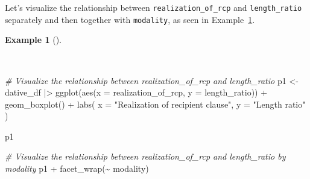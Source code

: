 \documentclass[
  letterpaper,
  DIV=11,
  numbers=noendperiod]{scrreprt}
\newenvironment{Shaded}{\begin{snugshade}}{\end{snugshade}}
\newcommand{\AttributeTok}[1]{\textcolor[rgb]{0.00,0.00,0.00}{#1}}
\newcommand{\CommentTok}[1]{\textcolor[rgb]{0.00,0.00,0.00}{\textit{#1}}}
\newcommand{\FunctionTok}[1]{\textcolor[rgb]{0.00,0.00,0.00}{#1}}
\newcommand{\NormalTok}[1]{\textcolor[rgb]{0.00,0.00,0.00}{#1}}
\newcommand{\OtherTok}[1]{\textcolor[rgb]{0.00,0.00,0.00}{#1}}
\newcommand{\SpecialCharTok}[1]{\textcolor[rgb]{0.00,0.00,0.00}{#1}}
\newcommand{\StringTok}[1]{\textcolor[rgb]{0.00,0.00,0.00}{#1}}
\theoremstyle{definition}
\newtheorem{example}{Example}[chapter]
\theoremstyle{remark}
\begin{document}
Let's visualize the relationship between \texttt{realization\_of\_rcp}
and \texttt{length\_ratio} separately and then together with
\texttt{modality}, as seen in
Example~\ref{exm-ida-cat-bivariate-vis-length-ratio}.

\begin{example}[]\protect\hypertarget{exm-ida-cat-bivariate-vis-length-ratio}{}\label{exm-ida-cat-bivariate-vis-length-ratio}

~

\begin{Shaded}
\begin{Highlighting}[]
\CommentTok{\# Visualize the relationship between \textasciigrave{}realization\_of\_rcp\textasciigrave{} and \textasciigrave{}length\_ratio\textasciigrave{}}
\NormalTok{p1 }\OtherTok{\textless{}{-}}
\NormalTok{  dative\_df }\SpecialCharTok{|\textgreater{}}
  \FunctionTok{ggplot}\NormalTok{(}\FunctionTok{aes}\NormalTok{(}\AttributeTok{x =}\NormalTok{ realization\_of\_rcp, }\AttributeTok{y =}\NormalTok{ length\_ratio)) }\SpecialCharTok{+}
  \FunctionTok{geom\_boxplot}\NormalTok{() }\SpecialCharTok{+}
  \FunctionTok{labs}\NormalTok{(}
    \AttributeTok{x =} \StringTok{"Realization of recipient clause"}\NormalTok{,}
    \AttributeTok{y =} \StringTok{"Length ratio"}
\NormalTok{  )}

\NormalTok{p1}

\CommentTok{\# Visualize the relationship between \textasciigrave{}realization\_of\_rcp\textasciigrave{} and \textasciigrave{}length\_ratio\textasciigrave{} by \textasciigrave{}modality\textasciigrave{}}
\NormalTok{p1 }\SpecialCharTok{+}
  \FunctionTok{facet\_wrap}\NormalTok{(}\SpecialCharTok{\textasciitilde{}}\NormalTok{ modality)}
\end{Highlighting}
\end{Shaded}

\begin{figure}[H]

\begin{minipage}{0.50\linewidth}



\end{minipage}%
%
\begin{minipage}{0.50\linewidth}


\end{minipage}
\end{figure}
\end{example}
\end{document}

